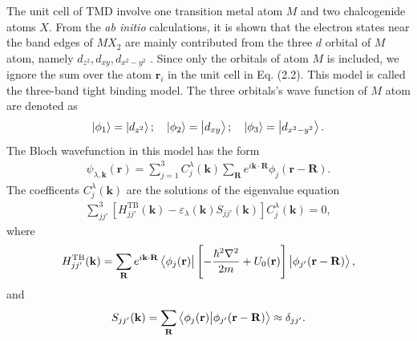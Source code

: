 \documentclass{report}
\newcommand{\f}[2]{\dfrac{#1}{#2}}
\begin{document}
The unit cell of \ac{TMD} involve one transition metal atom $M$ and two chalcogenide atoms $X$. From the \textit{ab initio} calculations, it is shown that the electron states near the band edges of $MX_{2}$ are mainly contributed from the three $d$ orbital of $M$ atom, namely $d_{z^{2}},d_{xy},d_{x^{2}-y^{2}}$ \cite{PhysRevB.88.085433}. Since only the orbitals of atom $M$ is included, we ignore the sum over the atom $\mathbf{r}_{i}$ in the unit cell in Eq. (2.2). This model is called the three-band tight binding model. The three orbitals's wave function of $M$ atom are denoted as
\begin{gather}
	\ket{\phi_{1}} = \ket{d_{z^{2}}} ; \quad \ket{\phi_{2}} = \ket{d_{xy}} ; \quad \ket{\phi_{3}} = \ket{d_{x^{2} - y^{2}}}.
\end{gather}
The Bloch wavefunction in this model has the form
\begin{gather}
	\psi_{\lambda,\mathbf{k}}(\mathbf{r}) = \sum_{j=1}^{3} C_{j}^{\lambda}(\mathbf{k}) \sum_{\mathbf{R}} e^{i \mathbf{k \cdot R}} \phi_{j}(\mathbf{r} - \mathbf{R}).
\end{gather}
The coefficents $C_{j}^{\lambda}(\mathbf{k})$ are the solutions of the eigenvalue equation
\begin{gather}
	\sum_{jj'}^{3} \left[H_{jj'}^{\text{TB}}(\mathbf{k}) - \varepsilon_{\lambda}(\mathbf{k}) S_{jj'}(\mathbf{k})\right] C_{j}^{\lambda}(\mathbf{k}) = 0,
\end{gather}
where
\begin{gather}
	H_{jj'}^{\text{TB}}(\mathbf{k}) = \sum_{\mathbf{R}} e^{i \mathbf{k \cdot R}} \bra{\phi_{j}(\mathbf{r})} \left[-\f{\hbar^{2} \nabla^{2}}{2m} + U_{0}(\mathbf{r})\right] \ket{\phi_{j'}(\mathbf{r - R})},
\end{gather}
and
\begin{gather}
	S_{jj'}(\mathbf{k}) = \sum_{\mathbf{R}} \bra{\phi_{j}(\mathbf{r})} \ket{\phi_{j'}(\mathbf{r - R})} \approx \delta_{jj'}.
\end{gather}
\end{document}
